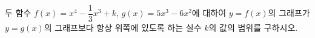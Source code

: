 두 함수 $f(x)=x^4-\dfrac{1}{3}x^3+k$, $g(x)=5x^3-6x^2$에 대하여 $y=f(x)$의 그래프가 $y=g(x)$의 그래프보다 항상 위쪽에 있도록 하는 실수 $k$의 값의 범위를 구하시오.

